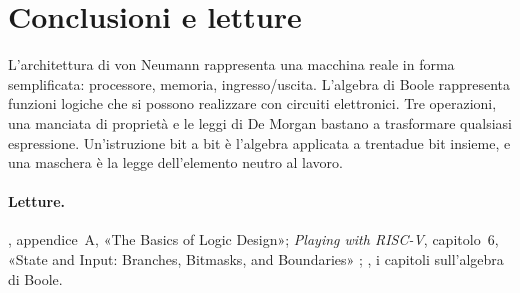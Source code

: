 \section{Conclusioni e letture}

L'architettura di von Neumann rappresenta una macchina reale in forma
semplificata: processore, memoria, ingresso/uscita. L'algebra di Boole
rappresenta funzioni logiche che si possono realizzare con circuiti
elettronici. Tre operazioni, una manciata di proprietà e le leggi di De Morgan
bastano a trasformare qualsiasi espressione. Un'istruzione bit a bit è
l'algebra applicata a trentadue bit insieme, e una maschera è la legge
dell'elemento neutro al lavoro.

\paragraph{Letture.} \citet{patterson2020}, appendice~A, «The Basics of Logic
Design»; \emph{Playing with RISC-V}, capitolo~6, «State and Input: Branches,
Bitmasks, and Boundaries» \citep{prg32textbook}; \citet{bucci2017}, i capitoli
sull'algebra di Boole.
